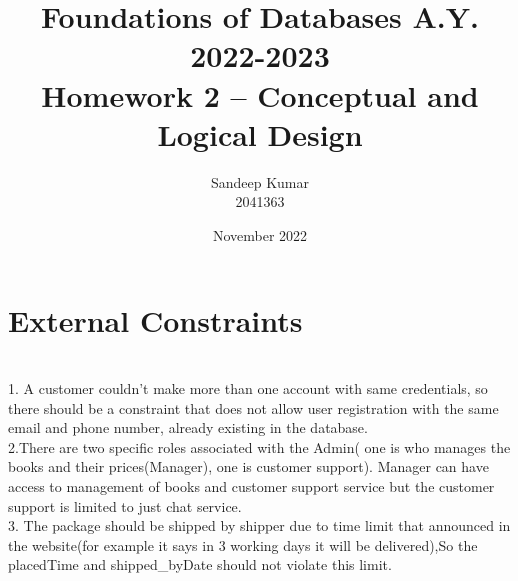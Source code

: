 \documentclass{article}
\title{Foundations of Databases A.Y. 2022-2023
\\Homework 2 – Conceptual and Logical Design
}
\author{Sandeep Kumar
\\ 2041363}
\date{November 2022}
\begin{document}
\maketitle

\section{External Constraints}
\\1. A customer couldn't make more than one account with same credentials, so there should be a constraint that does not allow user registration with the same email and phone number, already existing in the database. 
\\2.There are two specific roles associated with the Admin( one is who manages the books and their prices(Manager), one is customer support). Manager can have access to management of books and customer support service but the customer support is limited to just chat service.
\\3. The package should be shipped by shipper due to time limit that announced in the website(for example it says in 3 working days it will be delivered),So the placedTime and shipped_byDate should not violate this limit.
\end{document}
